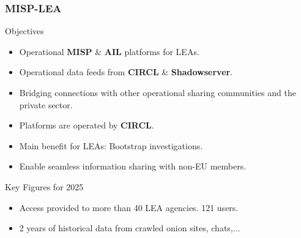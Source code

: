 \begin{frame}
\frametitle{MISP-LEA}
\begin{block}{Objectives}
    \begin{itemize}
        \item Operational \textbf{MISP} \& \textbf{AIL} platforms for LEAs.
        \item Operational data feeds from \textbf{CIRCL} \& \textbf{Shadowserver}.
        \item Bridging connections with other operational sharing communities and the private sector.
        \item Platforms are operated by \textbf{CIRCL}.
        \item Main benefit for LEAs: \alert{Bootstrap investigations}.
        \item Enable seamless information sharing with non-EU members.
    \end{itemize}
\end{block}

\begin{block}{Key Figures for 2025}
    \begin{itemize}
        \item Access provided to more than 40 LEA agencies. 121 users.
        \item 2 years of historical data from crawled onion sites, chats,...
    \end{itemize}
\end{block}
\end{frame}

